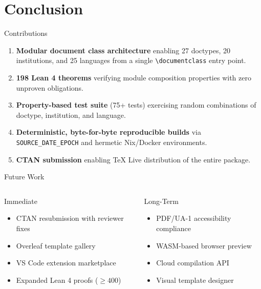 \documentclass[
  doctype=beamer,
  beameraspectratio=169,
  beamertheme=Copenhagen,
  language=english,
]{omnilatex}
\begin{document}
\section{Conclusion}

\begin{frame}{Contributions}
  \begin{enumerate}
    \item \textbf{Modular document class architecture} enabling 27 doctypes, 20 institutions, and 25 languages from a single \texttt{\textbackslash documentclass} entry point.
    \item \textbf{198 Lean 4 theorems} verifying module composition properties with zero unproven obligations.
    \item \textbf{Property-based test suite} (75+ tests) exercising random combinations of doctype, institution, and language.
    \item \textbf{Deterministic, byte-for-byte reproducible builds} via \texttt{SOURCE\_DATE\_EPOCH} and hermetic Nix/Docker environments.
    \item \textbf{CTAN submission} enabling TeX Live distribution of the entire package.
  \end{enumerate}
\end{frame}

\begin{frame}{Future Work}
  \begin{columns}[T]
    \begin{block}{Immediate}
      \begin{itemize}
        \item CTAN resubmission with reviewer fixes
        \item Overleaf template gallery
        \item VS Code extension marketplace
        \item Expanded Lean 4 proofs ($\geq 400$)
      \end{itemize}
    \end{block}

    \begin{block}{Long-Term}
      \begin{itemize}
        \item PDF/UA-1 accessibility compliance
        \item WASM-based browser preview
        \item Cloud compilation API
        \item Visual template designer
      \end{itemize}
    \end{block}
  \end{columns}
\end{frame}
\end{document}
